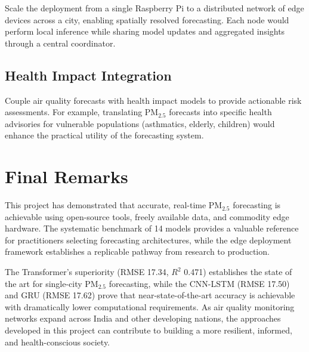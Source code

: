 Scale the deployment from a single Raspberry Pi to a distributed network of edge devices across a city, enabling spatially resolved forecasting. Each node would perform local inference while sharing model updates and aggregated insights through a central coordinator.

\subsection{Health Impact Integration}

Couple air quality forecasts with health impact models to provide actionable risk assessments. For example, translating PM$_{2.5}$ forecasts into specific health advisories for vulnerable populations (asthmatics, elderly, children) would enhance the practical utility of the forecasting system.

\section{Final Remarks}

This project has demonstrated that accurate, real-time PM$_{2.5}$ forecasting is achievable using open-source tools, freely available data, and commodity edge hardware. The systematic benchmark of 14 models provides a valuable reference for practitioners selecting forecasting architectures, while the edge deployment framework establishes a replicable pathway from research to production.

The Transformer's superiority (RMSE 17.34, $R^2$ 0.471) establishes the state of the art for single-city PM$_{2.5}$ forecasting, while the CNN-LSTM (RMSE 17.50) and GRU (RMSE 17.62) prove that near-state-of-the-art accuracy is achievable with dramatically lower computational requirements. As air quality monitoring networks expand across India and other developing nations, the approaches developed in this project can contribute to building a more resilient, informed, and health-conscious society.
